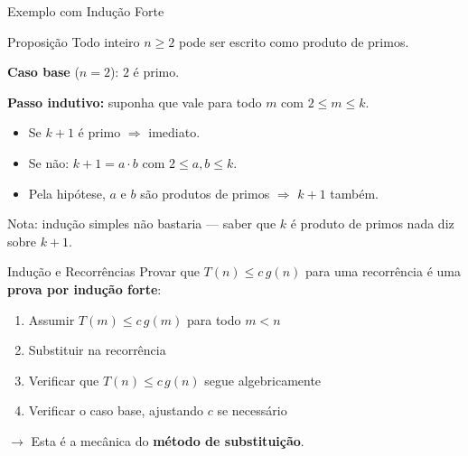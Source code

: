 \documentclass[aspectratio=169]{beamer}
\newcommand{\impt}[1]{\textcolor{maccent}{\textbf{#1}}}
\newcommand{\ntc}[1]{\textcolor{mprimary}{#1}}
\begin{document}
\begin{frame}{Exemplo com Indução Forte}
\begin{block}{Proposição}
Todo inteiro $n \geq 2$ pode ser escrito como produto de primos.
\end{block}

\vspace{0.2cm}
\pause

\textbf{Caso base} ($n=2$): $2$ é primo. \checkmark

\vspace{0.2cm}
\pause

\textbf{Passo indutivo:} suponha que vale para todo $m$ com $2 \leq m \leq k$.
\begin{itemize}
    \item Se $k+1$ é primo $\Rightarrow$ imediato.
    \pause
    \item Se não: $k+1 = a \cdot b$ com $2 \leq a, b \leq k$.
    \item Pela hipótese, $a$ e $b$ são produtos de primos $\Rightarrow$ $k+1$ também. \checkmark
\end{itemize}

\vspace{0.2cm}
\pause

\ntc{Nota:} indução simples não bastaria --- saber que $k$ é produto de primos nada diz sobre $k+1$.
\end{frame}


\begin{frame}{Indução e Recorrências}
Provar que $T(n) \leq c\,g(n)$ para uma recorrência é uma \impt{prova por indução forte}:

\vspace{0.3cm}

\begin{enumerate}
    \item Assumir $T(m) \leq c\,g(m)$ para todo $m < n$
    \pause
    \item Substituir na recorrência
    \pause
    \item Verificar que $T(n) \leq c\,g(n)$ segue algebricamente
    \pause
    \item Verificar o caso base, ajustando $c$ se necessário
\end{enumerate}

\vspace{0.3cm}

$\longrightarrow$ Esta é a mecânica do \impt{método de substituição}.
\end{frame}
\end{document}
